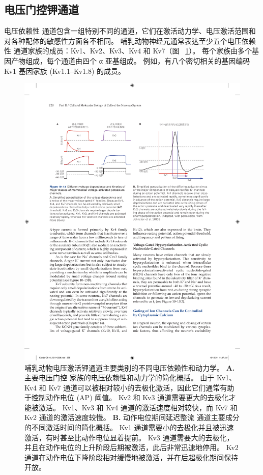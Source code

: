 \subsection{电压门控钾通道}

电压依赖性  通道包含一组特别不同的通道，它们在激活动力学、电压激活范围和对各种配体的敏感性方面各不相同。
哺乳动物神经元通常表达至少五个电压依赖性  通道家族的成员：Kv1、Kv2、Kv3、Kv4 和 Kv7（图 ~\ref{fig:10_13}）。
每个家族由多个基因产物组成，每个通道由四个 α 亚基组成。
例如，有八个密切相关的基因编码 Kv1 基因家族 (Kv1.1–Kv1.8) 的成员。


\begin{figure}[htbp]
	\centering
	\includegraphics[width=0.8\linewidth]{chap10/fig_10_13}
	\caption{哺乳动物电压激活钾通道主要类别的不同电压依赖性和动力学。
		\textbf{A.} 主要电压门控  家族的电压依赖性和动力学的简化概括。
		由于 Kv1、Kv4 和 Kv7 通道可以被相对较小的去极化激活，因此它们通常有助于控制动作电位 (AP) 阈值。
		Kv2 和 Kv3 通道需要更大的去极化才能被激活。 
		Kv1、Kv3 和 Kv4 通道的激活速度相对较快，而 Kv7 和 Kv2 通道的激活速度较慢。
		\textbf{B.} 动作电位期间延迟整流  通道主要成分的不同激活时间的简化概括。
		Kv1 通道需要小的去极化并且被迅速激活，有时甚至比动作电位显着提前。
		Kv3 通道需要大的去极化，并且在动作电位的上升阶段后期被激活，此后非常迅速地停用。
		Kv2 通道在动作电位下降阶段相对缓慢地被激活，并在后超极化期间保持开放\cite{johnston2010symposium}。}
	\label{fig:10_13}
\end{figure}


